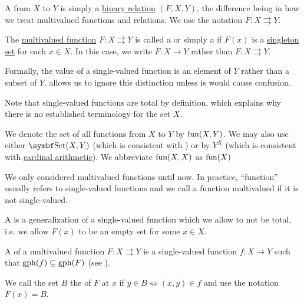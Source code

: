 \begin{definition}\label{def:function}
  A  from \( X \) to \( Y \) is simply a \hyperref[def:binary_relation]{binary relation} \( (F, X, Y) \), the difference being in how we treat multivalued functions and relations. We use the notation \( F: X \rightrightarrows Y \).

  \begin{DefEnum}[series=def:function]
     The \hyperref[def:function/multivalued]{multivalued function} \( F: X \rightrightarrows Y \) is called a  or simply a  if \( F(x) \) is a \hyperref[rem:singleton_sets]{singleton set} for each \( x \in X \). In this case, we write \( F: X \to Y \) rather than \( F: X \rightrightarrows Y \).

    Formally, the value of a single-valued function is an element of \( Y \) rather than a subset of \( Y \).  allows us to ignore this distinction unless is would cause confusion.

    Note that single-valued functions are total by definition, which explains why there is no established terminology for the set \( X \).

    We denote the set of all functions from \( X \) to \( Y \) by \( \operatorname{fun}(X, Y) \). We may also use either \( \Cat{Set}(X, Y) \) (which is consistent with ) or by \( Y^X \) (which is consistent with \hyperref[def:cardinal_arithmetic]{cardinal arithmetic}). We abbreviate \( \operatorname{fun}(X, X) \) as \( \operatorname{fun}(X) \)

     We only considered multivalued functions until now. In practice, \enquote{function} usually refers to single-valued functions and we call a function multivalued if it is not single-valued.

     A  is a generalization of a single-valued function which we allow to not be total, i.e. we allow \( F(x) \) to be an empty set for some \( x \in X \).

     A  of a multivalued function \( F: X \rightrightarrows Y \) is a single-valued function \( f: X \to Y \) such that \( \operatorname{gph}(f) \subseteq \operatorname{gph}(F) \) (see ).

     We call the set \( B \) the  of \( F \) at \( x \) if \( y \in B \iff (x, y) \in f \) and use the notation \( F(x) = B \).


\end{DefEnum}
\end{definition}
